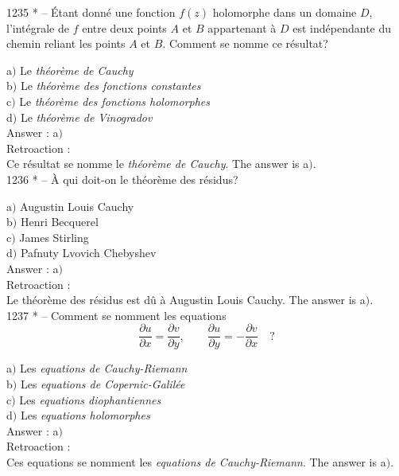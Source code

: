 ﻿\documentclass[letterpaper, 12pt]{article}
\begin{document}
1235 * -- \'Etant donn\'e une fonction $f(z)$ holomorphe dans un
domaine $D$, l'int\'egrale de $f$ entre deux points $A$ et $B$
appartenant \`a $D$ est ind\'ependante du chemin reliant les points
$A$ et $B$. Comment se nomme ce r\'esultat?

a$)$ Le {\sl th\'eor\`eme de Cauchy} \\
b$)$ Le {\sl th\'eor\`eme des fonctions constantes} \\
c$)$ Le {\sl th\'eor\`eme des fonctions holomorphes} \\
d$)$ Le {\sl th\'eor\`eme de Vinogradov}\\

Answer : a$)$\\

Retroaction : \\
Ce r\'esultat se nomme le {\sl th\'eor\`eme de Cauchy}.
The answer is a$)$.\\

1236 * -- \`A qui doit-on le th\'eor\`eme des r\'esidus?

a$)$ Augustin Louis Cauchy \\
b$)$ Henri Becquerel \\
c$)$ James Stirling \\
d$)$ Pafnuty Lvovich Chebyshev\\

Answer : a$)$\\

Retroaction : \\
Le th\'eor\`eme des r\'esidus est d\^u \`a Augustin Louis Cauchy.
The answer is a$)$.\\

1237 * -- Comment se nomment les equations
$$\displaystyle{\frac{\partial u}{\partial x}=\frac{\partial v}{\partial
y},\quad\quad\frac{\partial u}{\partial y}=-\frac{\partial v}{\partial
x}}\quad?$$

a$)$ Les {\sl equations de Cauchy-Riemann} \\
b$)$ Les {\sl equations de Copernic-Galil\'ee} \\
c$)$ Les {\sl equations diophantiennes} \\
d$)$ Les {\sl equations holomorphes}\\

Answer : a$)$\\

Retroaction : \\
Ces equations se nomment les {\sl equations de Cauchy-Riemann}.
The answer is a$)$.\\
\end{document}
